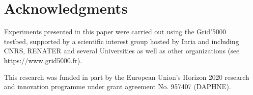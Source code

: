 \documentclass[sigconf,natbib=false]{acmart}
\begin{document}
%

\section*{Acknowledgments}


Experiments presented in this paper were carried out using the Grid'5000 testbed, supported by a scientific interest group hosted by Inria and including CNRS, RENATER and several Universities as well as other organizations (see https://www.grid5000.fr). 

This research was funded in part by the European Union’s Horizon 2020 research and innovation programme under grant agreement No. 957407 (DAPHNE).


\newpage
\newpage
%
%
\printbibliography
\end{document}
